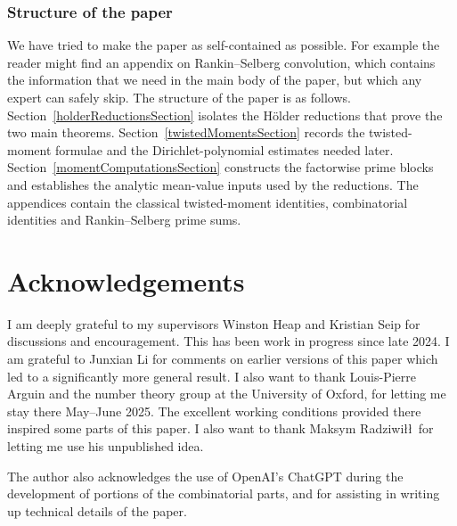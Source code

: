 \documentclass[oneside, 12pt]{amsart}
\theoremstyle{definition}
\begin{document}
	\subsubsection*{Structure of the paper}
	We have tried to make the paper as self-contained as possible. For example the reader might find an appendix on Rankin--Selberg convolution, which contains the information that we need in the main body of the paper, but which any expert can safely skip. The structure of the paper is as follows. Section~\ref{holderReductionsSection} isolates the Hölder reductions that prove the two main theorems.  Section~\ref{twistedMomentsSection} records the twisted-moment formulae and the Dirichlet-polynomial estimates needed later.  Section~\ref{momentComputationsSection} constructs the factorwise prime blocks and establishes the analytic mean-value inputs used by the reductions.  The appendices contain the classical twisted-moment identities, combinatorial identities and Rankin--Selberg prime sums.
	
	
	\section*{Acknowledgements}
	I am deeply grateful to my supervisors Winston Heap and Kristian Seip for {discussions} and encouragement. This has been work in progress since late 2024. I am grateful to Junxian Li for comments on earlier versions of this paper which led to a significantly more general result. I also want to thank Louis-Pierre Arguin and the number theory group at the University of Oxford, for letting me stay there May--June 2025. The excellent working conditions provided there inspired some parts of this paper. I also want to thank Maksym Radziwi\l\l\, for letting me use his unpublished idea.
	
	The author also acknowledges the use of OpenAI's ChatGPT during the development of portions of the combinatorial parts, and for assisting in writing up technical details of the paper.
	
	
	
\end{document}
